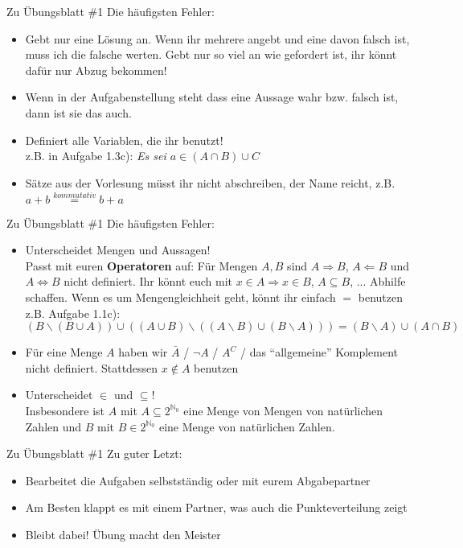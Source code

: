 \begin{frame}{Zu Übungsblatt \#1}
	Die häufigsten Fehler:
	\begin{itemize}[<+->]
		\item Gebt nur eine Lösung an. Wenn ihr mehrere angebt und eine davon falsch ist, muss ich die falsche werten.
		\implitem Gebt nur so viel an wie gefordert ist, ihr könnt dafür nur Abzug bekommen!
		\item Wenn in der Aufgabenstellung steht dass eine Aussage wahr bzw. falsch ist, dann ist sie das auch.
		\item Definiert alle Variablen, die ihr benutzt! \\
			z.B. in Aufgabe 1.3c): \textit{Es sei $a\in (A \cap B)\cup C$}
		\item Sätze aus der Vorlesung müsst ihr nicht abschreiben, der Name reicht, z.B. $ a + b \stackrel{kommutativ}{=} b + a$
	\end{itemize}
\end{frame}

\begin{frame}{Zu Übungsblatt \#1}
	Die häufigsten Fehler:
	\begin{itemize}[<+->]
		\item Unterscheidet Mengen und Aussagen! \\
		Passt mit euren \textbf{Operatoren} auf: Für Mengen $A,B$ sind $A \Rightarrow B$, $A \Leftarrow B$ und $A \Leftrightarrow B$ nicht definiert.
		\implitem Ihr könnt euch mit $x \in A \Rightarrow x \in B$, $A \subseteq B$, ... Abhilfe schaffen.
		\implitem Wenn es um Mengengleichheit geht, könnt ihr einfach $=$ benutzen \\
			z.B. Aufgabe 1.1c): $(B \backslash (B \cup A)) \cup ((A \cup B) \backslash ((A \backslash B) \cup (B \backslash A))) = (B \backslash A) \cup (A \cap B)$
		\item Für eine Menge $A$ haben wir $\bar{A}$ / $\neg A$ / $A^C$ / das ``allgemeine'' Komplement nicht definiert.
		\implitem Stattdessen $x \not\in A$ benutzen
		\item Unterscheidet $\in$ und $\subseteq$! \\
			Insbesondere ist $A$ mit $A \subseteq 2^{\mathbb{N}_0}$ eine Menge von Mengen von natürlichen Zahlen und $B$ mit $B \in 2^{\mathbb{N}_0}$ eine Menge von natürlichen Zahlen.
	\end{itemize}
\end{frame}

\begin{frame}{Zu Übungsblatt \#1}
	Zu guter Letzt:
	\begin{itemize}[<+->]
		\item Bearbeitet die Aufgaben selbstständig oder mit eurem Abgabepartner
		\item Am Besten klappt es mit einem Partner, was auch die Punkteverteilung zeigt
		\item Bleibt dabei! Übung macht den Meister
	\end{itemize}
\end{frame}



